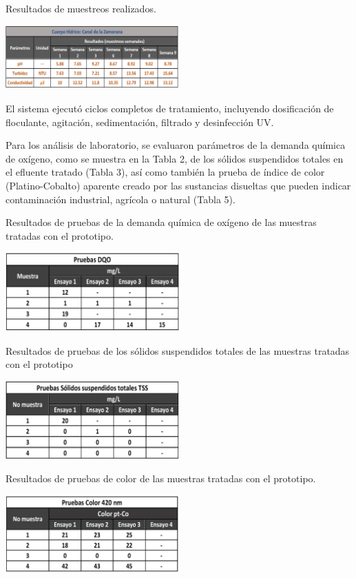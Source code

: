 \documentclass[conference]{IEEEtran}
\begin{document}
\begin{table}[h]
	\centering
	\caption{Resultados de muestreos realizados.}
	\includegraphics[width=0.5\textwidth]{tabla2.jpg}
	\label{tab:tabla01}
\end{table}

El sistema ejecutó ciclos completos de tratamiento, incluyendo dosificación de floculante, agitación, sedimentación, filtrado y desinfección UV.

Para los análisis de laboratorio, se evaluaron parámetros de la demanda química de oxígeno, como se muestra en la Tabla 2, de los sólidos suspendidos totales en el efluente tratado (Tabla 3), así como también la prueba de índice de color (Platino-Cobalto) aparente creado por las sustancias disueltas que pueden indicar contaminación industrial, agrícola o natural (Tabla 5).

\begin{table}[h]
	\centering
	\caption{Resultados de pruebas de la demanda química de oxígeno de las muestras tratadas con el prototipo.}
	\includegraphics[width=0.5\textwidth]{tabla3.jpg}
	\label{tab:tabla01}
\end{table}
		
\begin{table}[h]
	\centering
	\caption{Resultados de pruebas de los sólidos suspendidos totales de las muestras tratadas con el prototipo}
	\includegraphics[width=0.5\textwidth]{tabla4.jpg}
	\label{tab:tabla01}
\end{table}		
		
\begin{table}[h]
	\centering
	\caption{Resultados de pruebas de color de las muestras tratadas con el prototipo.}
	\includegraphics[width=0.5\textwidth]{tabla5.jpg}
	\label{tab:tabla01}
\end{table}
		
\end{document}
